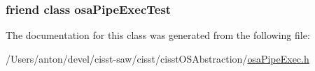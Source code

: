 \subsubsection[{osa\+Pipe\+Exec\+Test}]{\setlength{\rightskip}{0pt plus 5cm}friend class osa\+Pipe\+Exec\+Test\hspace{0.3cm}{\ttfamily [friend]}}\label{classosa_pipe_exec_aed1009b8c9ee63f8ec90db36f10ef0b7}


The documentation for this class was generated from the following file\+:\begin{DoxyCompactItemize}
\item 
/\+Users/anton/devel/cisst-\/saw/cisst/cisst\+O\+S\+Abstraction/\hyperlink{osa_pipe_exec_8h}{osa\+Pipe\+Exec.\+h}\end{DoxyCompactItemize}
